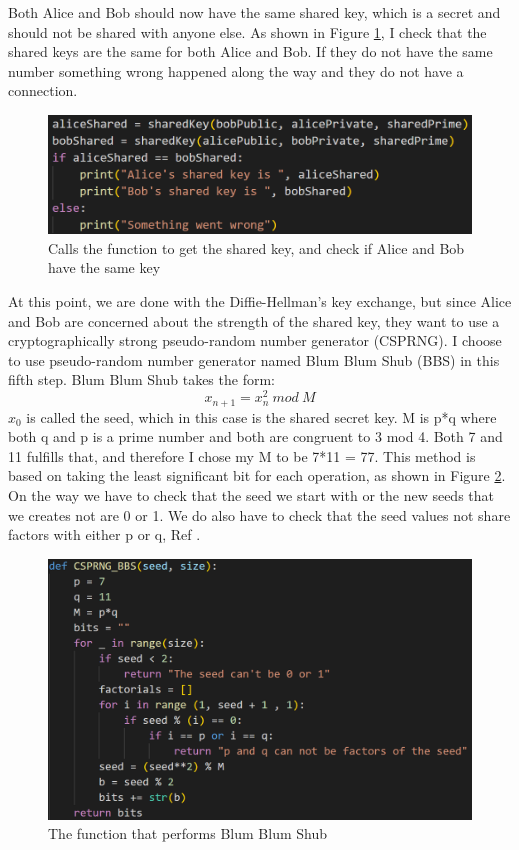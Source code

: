 \documentclass[12pt, letterpaper]{article}
\begin{document}
Both Alice and Bob should now have the same shared key, which is a secret and should not be shared with anyone else. As shown in Figure \ref{fig:step4}, I check that the shared keys are the same for both Alice and Bob. If they do not have the same number something wrong happened along the way and they do not have a connection.

\begin{figure}[H]
  \includegraphics[width=\linewidth]{code_snippets/step4.PNG}
  \caption{Calls the function to get the shared key, and check if Alice and Bob have the same key}
  \label{fig:step4}
\end{figure}

At this point, we are done with the Diffie-Hellman's key exchange, but since Alice and Bob are concerned about the strength of the shared key, they want to use a cryptographically strong pseudo-random number generator (CSPRNG). I choose to use pseudo-random number generator named Blum Blum Shub (BBS) in this fifth step. Blum Blum Shub takes the form: $$x_{n+1} = x^{2}_{n} \ mod \ M$$
$x_{0}$ is called the seed, which in this case is the shared secret key. M is p*q where both q and p is a prime number and both are congruent to 3 mod 4. Both 7 and 11 fulfills that, and therefore I chose my M to be 7*11 = 77. This method is based on taking the least significant bit for each operation, as shown in Figure \ref{fig:step5}. On the way we have to check that the seed we start with or the new seeds that we creates not are 0 or 1. We do also have to check that the seed values not share factors with either p or q, Ref \cite{BBS}.

\begin{figure}[H]
  \includegraphics[width=\linewidth]{code_snippets/step5.PNG}
  \caption{The function that performs Blum Blum Shub}
  \label{fig:step5}
\end{figure}
\end{document}
